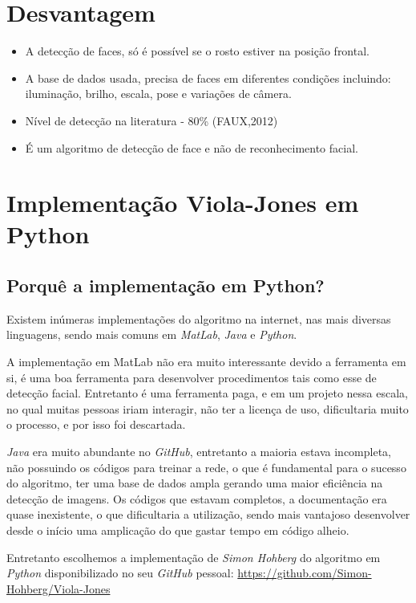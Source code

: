 \documentclass[12pt,a4paper]{article}
\begin{document}
\section{Desvantagem}
\begin{itemize}
	\item A detecção de faces, só é possível se o rosto estiver na posição frontal.
	\item A base de dados usada, precisa de faces em diferentes condições incluindo: iluminação, brilho, escala, pose e variações de câmera.
	\item Nível de detecção na literatura - 80\% (FAUX,2012)
	\item É um algoritmo de detecção de face e não de reconhecimento facial.
\end{itemize}

\section{Implementação Viola-Jones em Python}

\subsection{Porquê a implementação em Python?}
Existem inúmeras implementações do algoritmo na internet, nas mais diversas linguagens, sendo mais comuns em \textit{MatLab}, \textit{Java} e \textit{Python}. 

A implementação em MatLab não era muito interessante devido a ferramenta em si, é uma boa ferramenta para desenvolver procedimentos tais como esse de detecção facial. Entretanto é uma ferramenta paga, e em um projeto nessa escala, no qual muitas pessoas iriam interagir, não ter a licença de uso, dificultaria muito o processo, e por isso foi descartada.

\textit{Java} era muito abundante no \textit{GitHub}, entretanto a maioria estava incompleta, não possuindo os códigos para treinar a rede, o que é fundamental para o sucesso do algoritmo, ter uma base de dados ampla gerando uma maior eficiência na detecção de imagens. Os códigos que estavam completos, a documentação era quase inexistente, o que dificultaria a utilização, sendo mais vantajoso desenvolver desde o início uma amplicação do que gastar tempo em código alheio. 


Entretanto escolhemos a implementação de \textit{Simon Hohberg} do algoritmo em \textit{Python} disponibilizado no seu \textit{GitHub} pessoal:
\url{https://github.com/Simon-Hohberg/Viola-Jones}
\end{document}
